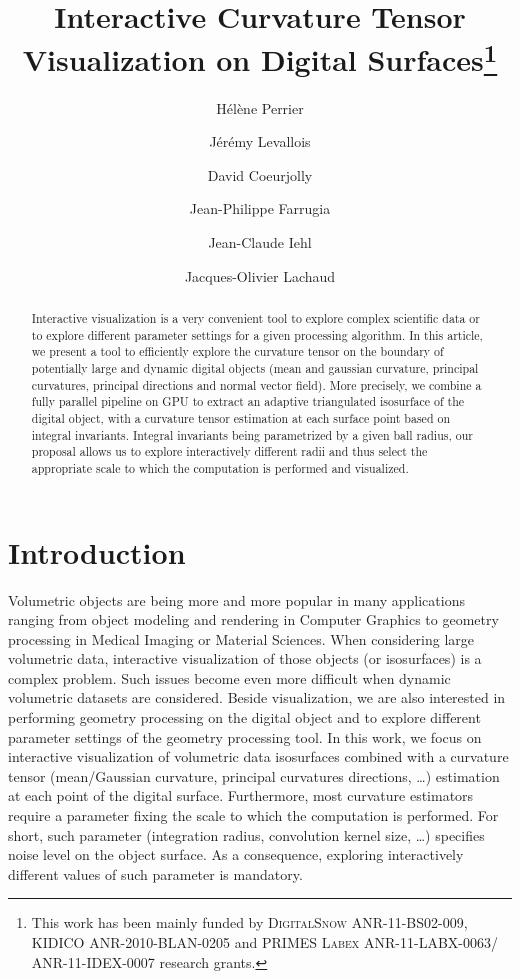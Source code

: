 \documentclass{llncs}
\title{Interactive Curvature Tensor Visualization on Digital
Surfaces\thanks{This work has been mainly funded by \textsc{DigitalSnow}
ANR-11-BS02-009, \textsc{KIDICO} ANR-2010-BLAN-0205 and \textsc{PRIMES Labex}
ANR-11-LABX-0063/ ANR-11-IDEX-0007 research grants.}}
\author{H\'el\`ene Perrier\inst{1}\and J\'er\'emy Levallois\inst{1,2}\and David
Coeurjolly\inst{1}\and Jean-Philippe Farrugia\inst{1}\and Jean-Claude
Iehl\inst{1}\and Jacques-Olivier Lachaud\inst{2} }
\institute{ Universit\'e de Lyon, CNRS\\
   LIRIS, UMR5205, F-69621, France
   \and
Universit\'e de Savoie, CNRS\\
LAMA, UMR5127, F-73776, France\\
}
\begin{document}
\maketitle


\begin{abstract}\sloppy
  Interactive visualization is a very convenient tool to explore
  complex scientific data or to explore different parameter settings
  for a given processing algorithm. In this article, we present a tool
  to efficiently explore the curvature tensor on the boundary of
  potentially large and dynamic digital objects (mean and gaussian curvature,
  principal curvatures, principal directions and normal vector
  field). More precisely, we combine a fully parallel pipeline on GPU
  to extract an adaptive triangulated isosurface of the digital
  object, with a curvature tensor estimation at each surface point
  based on integral invariants. Integral invariants being parametrized
  by a given ball radius, our proposal allows us to explore
  interactively different radii and thus select the appropriate scale
  to which the computation is performed and visualized.

\end{abstract}

\section{Introduction}
\label{sec:introduction}

Volumetric objects are being more and more popular in many
applications ranging from object modeling and rendering in Computer
Graphics to geometry processing in Medical Imaging or Material
Sciences. When considering large volumetric data, interactive
visualization of those objects (or isosurfaces) is a complex
problem. Such issues become even more difficult when dynamic
volumetric datasets are considered. Beside
visualization, we are also interested in performing geometry
processing on the digital object and to explore different parameter
settings of the geometry processing tool.  In this work, we focus on
interactive visualization of volumetric data isosurfaces combined with
a curvature tensor (mean/Gaussian curvature, principal curvatures
directions, \ldots) estimation at each point of the digital
surface.
Furthermore,
most curvature estimators require a parameter fixing the scale
to which the computation is performed. For short, such parameter
(integration radius, convolution kernel size, \ldots) specifies noise
level on the object surface. As a consequence, exploring interactively
different values of such parameter is mandatory.
\vspace{0.2cm}
\end{document}
